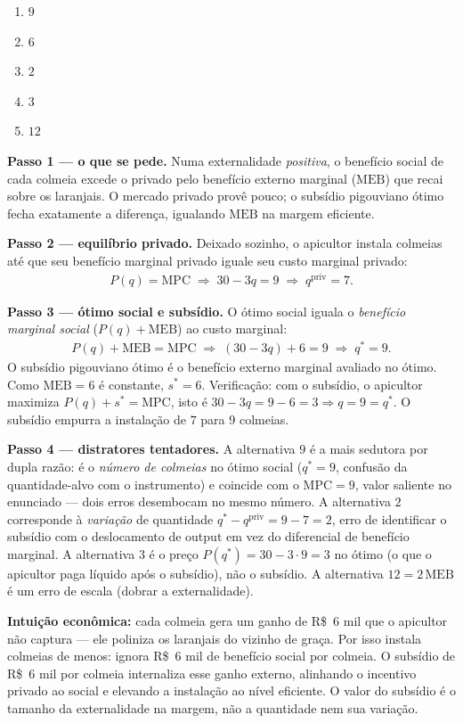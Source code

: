 \begin{enumerate}[label=\Alph*., leftmargin=3.2em, itemsep=0.05em, topsep=0.1em]
  \item $9$
  \item $6$
  \item $2$
  \item $3$
  \item $12$
\end{enumerate}
\begin{solucao}
\textbf{Passo 1 — o que se pede.} Numa externalidade \emph{positiva}, o benefício social de cada colmeia excede o privado pelo benefício externo marginal ($\text{MEB}$) que recai sobre os laranjais. O mercado privado provê pouco; o subsídio pigouviano ótimo fecha exatamente a diferença, igualando $\text{MEB}$ na margem eficiente.

\textbf{Passo 2 — equilíbrio privado.} Deixado sozinho, o apicultor instala colmeias até que seu benefício marginal privado iguale seu custo marginal privado:
\begin{align*}
P(q)=\text{MPC}\;\Longrightarrow\; 30-3q=9\;\Longrightarrow\; q^{\text{priv}}=7.
\end{align*}

\textbf{Passo 3 — ótimo social e subsídio.} O ótimo social iguala o \emph{benefício marginal social} ($P(q)+\text{MEB}$) ao custo marginal:
\begin{align*}
P(q)+\text{MEB}=\text{MPC}\;\Longrightarrow\; (30-3q)+6=9\;\Longrightarrow\; q^{*}=9.
\end{align*}
O subsídio pigouviano ótimo é o benefício externo marginal avaliado no ótimo. Como $\text{MEB}=6$ é constante, $s^{*}=6$. Verificação: com o subsídio, o apicultor maximiza $P(q)+s^{*}=\text{MPC}$, isto é $30-3q=9-6=3\Rightarrow q=9=q^{*}$. O subsídio empurra a instalação de $7$ para $9$ colmeias.

\textbf{Passo 4 — distratores tentadores.} A alternativa $9$ é a mais sedutora por dupla razão: é o \emph{número de colmeias} no ótimo social ($q^{*}=9$, confusão da quantidade-alvo com o instrumento) e coincide com o $\text{MPC}=9$, valor saliente no enunciado — dois erros desembocam no mesmo número. A alternativa $2$ corresponde à \emph{variação} de quantidade $q^{*}-q^{\text{priv}}=9-7=2$, erro de identificar o subsídio com o deslocamento de output em vez do diferencial de benefício marginal. A alternativa $3$ é o preço $P(q^{*})=30-3\cdot 9=3$ no ótimo (o que o apicultor paga líquido após o subsídio), não o subsídio. A alternativa $12=2\,\text{MEB}$ é um erro de escala (dobrar a externalidade).

\textbf{Intuição econômica:} cada colmeia gera um ganho de R\$~6 mil que o apicultor não captura — ele poliniza os laranjais do vizinho de graça. Por isso instala colmeias de menos: ignora R\$~6 mil de benefício social por colmeia. O subsídio de R\$~6 mil por colmeia internaliza esse ganho externo, alinhando o incentivo privado ao social e elevando a instalação ao nível eficiente. O valor do subsídio é o tamanho da externalidade na margem, não a quantidade nem sua variação.
\end{solucao}


